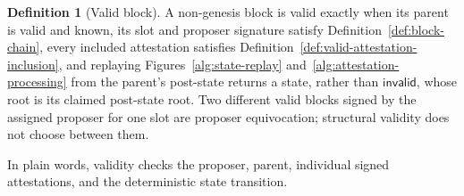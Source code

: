 \ifx\litemode\undefined\documentclass{article}\fi
\theoremstyle{plain}
\theoremstyle{definition}
\newtheorem{definition}{Definition}
\theoremstyle{remark}
\begin{document}
\begin{definition}[Valid block]\label{def:valid-block}
A non-genesis block is valid exactly when its parent is valid and known, its
slot and proposer signature satisfy Definition~\ref{def:block-chain}, every
included attestation satisfies
Definition~\ref{def:valid-attestation-inclusion}, and replaying
Figures~\ref{alg:state-replay} and~\ref{alg:attestation-processing} from the
parent's post-state returns a state, rather than \(\mathsf{invalid}\), whose
root is its claimed post-state root.  Two different valid blocks signed by
the assigned proposer for one slot are proposer equivocation; structural
validity does not choose between them.

In plain words, validity checks the proposer, parent, individual signed
attestations, and the deterministic state transition.
\end{definition}
\end{document}
